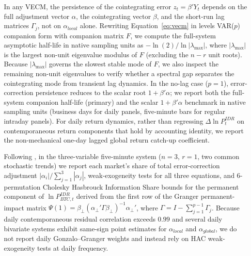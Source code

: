 In any VECM, the persistence of the cointegrating error $z_t = \beta' Y_t$ depends on the full adjustment vector $\alpha$, the cointegrating vector $\beta$, and the short-run lag matrices $\Gamma_j$, not on $\alpha_{local}$ alone. Rewriting Equation~\eqref{eq:vecm} in levels VAR($p$) companion form with companion matrix $F$, we compute the full-system asymptotic half-life in native sampling units as $-\ln(2)/\ln|\lambda_{\max}|$, where $|\lambda_{\max}|$ is the largest non-unit eigenvalue modulus of $F$ (excluding the $n - r$ unit roots). Because $|\lambda_{\max}|$ governs the slowest stable mode of $F$, we also inspect the remaining non-unit eigenvalues to verify whether a spectral gap separates the cointegrating mode from transient lag dynamics. In the no-lag case ($p=1$), error-correction persistence reduces to the scalar root $1 + \beta'\alpha$; we report both the full-system companion half-life (primary) and the scalar $1 + \beta'\alpha$ benchmark in native sampling units (business days for daily panels, five-minute bars for regular intraday panels). For daily return dynamics, rather than regressing $\Delta \ln P_t^{IDR}$ on contemporaneous return components that hold by accounting identity, we report the non-mechanical one-day lagged global return catch-up coefficient.

Following \citet{hasbrouck1995one}, in the three-variable five-minute system ($n = 3$, $r = 1$, two common stochastic trends) we report each market's share of total error-correction adjustment $|\alpha_i|/\sum_{j=1}^3 |\alpha_j|$, weak-exogeneity tests for all three equations, and 6-permutation Cholesky Hasbrouck Information Share bounds for the permanent component of $\ln P_{BTC,t}^{IDR}$ derived from the first row of the Granger permanent-impact matrix $\Psi(1) = \beta_\perp(\alpha_\perp' \Gamma \beta_\perp)^{-1}\alpha_\perp'$, where $\Gamma = I - \sum_{j=1}^{p-1}\Gamma_j$. Because daily contemporaneous residual correlation exceeds $0.99$ and several daily bivariate systems exhibit same-sign point estimates for $\alpha_{local}$ and $\alpha_{global}$, we do not report daily Gonzalo--Granger weights and instead rely on HAC weak-exogeneity tests at daily frequency.

